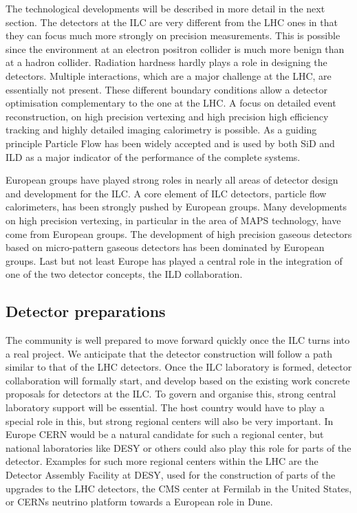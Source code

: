\documentclass[%
 reprint,
 amsmath,amssymb,
 aps,
]{revtex4-1}
\begin{document}
The technological developments will be described in more detail in the next section. The detectors at the ILC are very different from the LHC ones in that they can focus much more strongly on precision measurements. This is possible since the environment at an electron positron collider is much more benign than at a hadron collider. Radiation hardness hardly plays a role in designing the detectors. Multiple interactions, which are a major challenge at the LHC, are essentially not present. These different boundary conditions allow a detector optimisation complementary to the one at the LHC. A focus on detailed event reconstruction, on high precision vertexing and high precision high efficiency tracking and highly detailed imaging calorimetry is possible. As a guiding principle Particle Flow has been widely accepted and is used by both SiD and ILD as a major indicator of the performance of the complete systems. 

European groups have played strong roles in nearly all areas of detector design and development for the ILC. A core element of ILC detectors, particle flow calorimeters, has been strongly pushed by European groups. Many developments on high precision vertexing, in particular in the area of MAPS technology, have come from European groups. The development of high precision gaseous detectors based on micro-pattern gaseous detectors has been dominated by European groups. Last but not least Europe has played a central role in the integration of one of the two detector concepts, the ILD collaboration.  

\subsection{Detector preparations~\label{sec:prepphase:detectors}}
The community is well prepared to move forward quickly once the ILC turns into a real project. We anticipate that the detector construction will follow a path similar to that of the LHC detectors. Once the ILC laboratory is formed, detector collaboration will formally start, and develop based on the existing work concrete proposals for detectors at the ILC. To govern and organise this, strong central laboratory support will be essential. The host country would have to play a special role in this, but strong regional centers will also be very important.  In Europe CERN would be a natural candidate for such a regional center, but national laboratories like DESY or others could also play this role for parts of the detector. Examples for such more regional centers within the LHC are the Detector Assembly Facility at DESY, used for the construction of parts of the upgrades to the LHC detectors, the CMS center at Fermilab in the United States, or CERNs neutrino platform towards a European role in Dune. 
\end{document}
